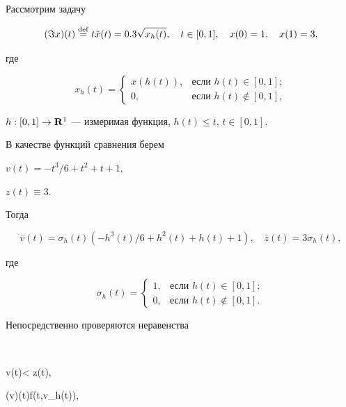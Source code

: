 \begin{exam} Рассмотрим задачу


\begin{equation}


({\Im}x)(t)\overset{\mathrm{def}}{=}{}


t \Ddot{x} (t)=0.3 \sqrt{\smash[b]{x_h(t)}}, \quad


t\in [0,1],\quad x(0)=1, \quad x(1)=3,


\end{equation}


где


$$


x_h(t)=


\begin{cases}


x(h(t)), & \text{если } h(t)\in[0,1]; \\


0, & \text{если } h(t)\notin[0,1],


\end{cases}


$$


$h:[0,1]\to\bold R^1$ --- измеримая функция, $h(t)\le t$, $t\in[0,1]$.


В качестве функций сравнения берем


$v(t)=-t^3/6+t^2+t+1$,


$z(t)\equiv 3$.


Тогда


$$


\overline {v}(t)=\sigma_h(t)(


-h^3(t)/6+h^2(t)+h(t)+1),\quad


\overline {z}(t)=3\sigma_h(t),


$$


где


$$


\sigma_h(t)=


\begin{cases}


1, & \text{если } h(t)\in[0,1]; \\


0, & \text{если } h(t)\notin[0,1].


\end{cases}


$$


Непосредственно проверяются неравенства


$$


v(t)< z(t), \quad


(\Im v)(t)\ge f(t,v_h(t)), \quad



\end{exam}
